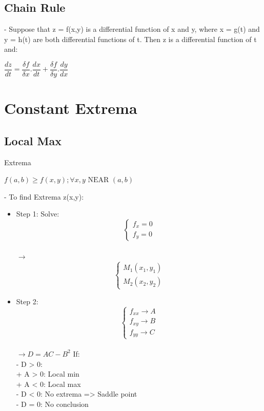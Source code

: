 \documentclass[12pt]{article}
\begin{document}
\subsection{Chain Rule}
- Suppose that z = f(x,y) is a differential function of x and y, where x = g(t) and y = h(t) are both differential functions of t. Then z is a differential function of t and:
\begin{mybox}
	\begin{center}
		$\dfrac{dz}{dt} = \dfrac{\delta f}{\delta x} . \dfrac{dx}{dt} + \dfrac{\delta f}{\delta y} . \dfrac{dy}{dx}$
	\end{center}
\end{mybox}
\section{Constant Extrema}
\subsection{Local Max} {Extrema}
\begin{mybox}
	\begin{center}
		$f(a,b) \ge f(x,y); \forall x,y \mbox{ NEAR } (a,b)$
	\end{center}
\end{mybox}
- To find Extrema z(x,y):
\begin{itemize}
	\item Step 1: Solve: \\
	$$
	\begin{cases}
		f_{x} = 0 \\
		f_{y} = 0
	\end{cases}
	$$
	\\
	$\rightarrow$
	$$
	\begin{cases}
		M_1 (x_1,y_1) \\
		M_2 (x_2,y_2)
	\end{cases}
	$$
	\item Step 2: \\
		$$
		\begin{cases}
			f_{xx} \rightarrow A \\
			f_{xy} \rightarrow B \\
			f_{yy} \rightarrow C
		\end{cases}
		$$
		\\
		$\rightarrow D = AC - B^2$
		If: \\
		- D > 0: \\
		+ A > 0: Local min \\ 
		+ A < 0: Local max \\ 
		- D < 0: No extrema => Saddle point \\ 
		- D = 0: No conclusion 
\end{itemize}
\end{document}
